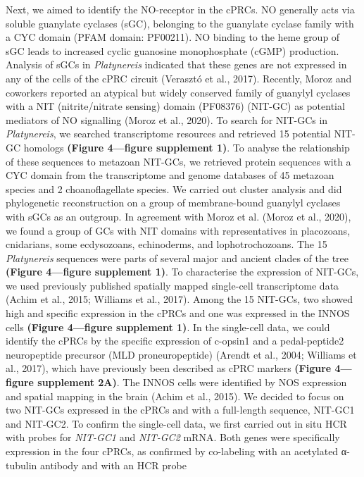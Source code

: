 \documentclass[
  10pt,
  onecolumn]{article}
\begin{document}
Next, we aimed to identify the NO-receptor in the cPRCs. NO generally
acts via soluble guanylate cyclases (sGC), belonging to the guanylate
cyclase family with a CYC domain (PFAM domain: PF00211). NO binding to
the heme group of sGC leads to increased cyclic guanosine monophosphate
(cGMP) production. Analysis of sGCs in \emph{Platynereis} indicated that
these genes are not expressed in any of the cells of the cPRC circuit
(Verasztó et al., 2017). Recently, Moroz and coworkers reported an
atypical but widely conserved family of guanylyl cyclases with a NIT
(nitrite/nitrate sensing) domain (PF08376) (NIT-GC) as potential
mediators of NO signalling (Moroz et al., 2020). To search for NIT-GCs
in \emph{Platynereis}, we searched transcriptome resources and retrieved
15 potential NIT-GC homologs \textbf{(Figure 4---figure supplement 1)}.
To analyse the relationship of these sequences to metazoan NIT-GCs, we
retrieved protein sequences with a CYC domain from the transcriptome and
genome databases of 45 metazoan species and 2 choanoflagellate species.
We carried out cluster analysis and did phylogenetic reconstruction on a
group of membrane-bound guanylyl cyclases with sGCs as an outgroup. In
agreement with Moroz et al. (Moroz et al., 2020), we found a group of
GCs with NIT domains with representatives in placozoans, cnidarians,
some ecdysozoans, echinoderms, and lophotrochozoans. The 15
\emph{Platynereis} sequences were parts of several major and ancient
clades of the tree \textbf{(Figure 4---figure supplement 1)}. To
characterise the expression of NIT-GCs, we used previously published
spatially mapped single-cell transcriptome data (Achim et al., 2015;
Williams et al., 2017). Among the 15 NIT-GCs, two showed high and
specific expression in the cPRCs and one was expressed in the INNOS
cells \textbf{(Figure 4---figure supplement 1)}. In the single-cell
data, we could identify the cPRCs by the specific expression of c-opsin1
and a pedal-peptide2 neuropeptide precursor (MLD proneuropeptide)
(Arendt et al., 2004; Williams et al., 2017), which have previously been
described as cPRC markers \textbf{(Figure 4---figure supplement 2A)}.
The INNOS cells were identified by NOS expression and spatial mapping in
the brain (Achim et al., 2015). We decided to focus on two NIT-GCs
expressed in the cPRCs and with a full-length sequence, NIT-GC1 and
NIT-GC2. To confirm the single-cell data, we first carried out in situ
HCR with probes for \emph{NIT-GC1} and \emph{NIT-GC2} mRNA. Both genes
were specifically expression in the four cPRCs, as confirmed by
co-labeling with an acetylated α-tubulin antibody and with an HCR probe
\end{document}
